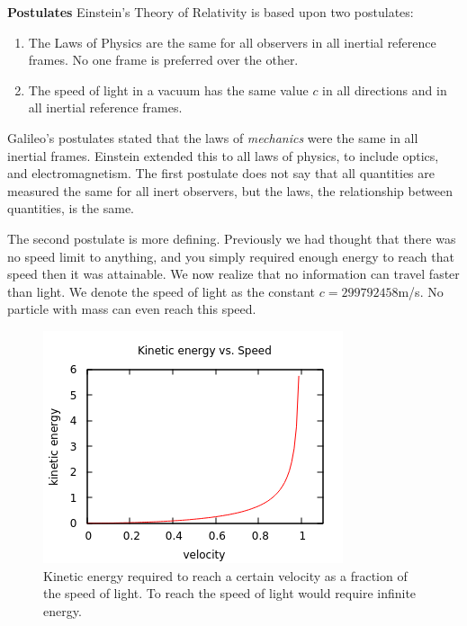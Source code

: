 \documentclass[conference]{IEEEtran}
\begin{document}
\textbf{Postulates} Einstein's Theory of Relativity is based upon two postulates: 
\begin{enumerate}
\item The Laws of Physics are the same for all observers in all inertial reference frames. No one frame is preferred over the other.
\item The speed of light in a vacuum has the same value $c$ in all directions and in all inertial reference frames.
\end{enumerate} 

Galileo's postulates stated that the laws of \textit{mechanics} were the same in all inertial frames. Einstein extended this to all laws of physics, to include optics, and electromagnetism. The first postulate does not say that all quantities are measured the same for all inert observers, but the laws, the relationship between quantities, is the same. 

The second postulate is more defining. Previously we had thought that there was no speed limit to anything, and you simply required enough energy to reach that speed then it was attainable. We now realize that no information can travel faster than light. We denote the speed of light as the constant $c = 299792458$m/s. No particle with mass can even reach this speed.
\begin{figure}[ht!]
\includegraphics[scale=1]{./IMG/energyVsSpeed.png} 
\caption{Kinetic energy required to reach a certain velocity as a fraction of the speed of light. To reach the speed of light would require infinite energy.}
\end{figure}
\end{document}
